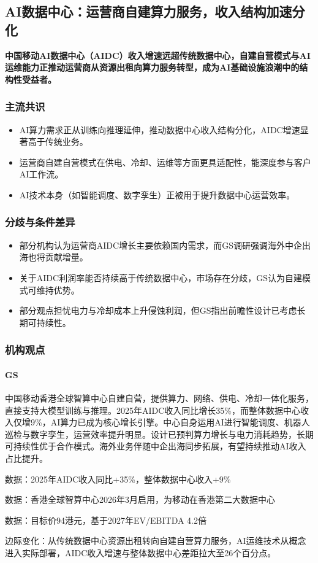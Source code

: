 \documentclass[11pt]{ctexart}
\begin{document}
\subsection{AI数据中心：运营商自建算力服务，收入结构加速分化}
\textbf{中国移动AI数据中心（AIDC）收入增速远超传统数据中心，自建自营模式与AI运维能力正推动运营商从资源出租向算力服务转型，成为AI基础设施浪潮中的结构性受益者。}
\subsubsection*{主流共识}
\begin{itemize}
  \item AI算力需求正从训练向推理延伸，推动数据中心收入结构分化，AIDC增速显著高于传统业务。
  \item 运营商自建自营模式在供电、冷却、运维等方面更具适配性，能深度参与客户AI工作流。
  \item AI技术本身（如智能调度、数字孪生）正被用于提升数据中心运营效率。
\end{itemize}
\subsubsection*{分歧与条件差异}
\begin{itemize}
  \item 部分机构认为运营商AIDC增长主要依赖国内需求，而GS调研强调海外中企出海也将贡献增量。
  \item 关于AIDC利润率能否持续高于传统数据中心，市场存在分歧，GS认为自建模式可维持优势。
  \item 部分观点担忧电力与冷却成本上升侵蚀利润，但GS指出前瞻性设计已考虑长期可持续性。
\end{itemize}
\subsubsection*{机构观点}
\paragraph{GS} 中国移动香港全球智算中心自建自营，提供算力、网络、供电、冷却一体化服务，直接支持大模型训练与推理。2025年AIDC收入同比增长35\%，而整体数据中心收入仅增9\%，AI算力已成为核心增长引擎。中心自身运用AI进行智能调度、机器人巡检与数字孪生，运营效率提升明显。设计已预判算力增长与电力消耗趋势，长期可持续性优于合作模式。海外业务伴随中企出海同步拓展，有望持续推动AI收入占比提升。
{\small\color{refgray}数据：2025年AIDC收入同比+35\%，整体数据中心收入+9\%\par}
{\small\color{refgray}数据：香港全球智算中心2026年3月启用，为移动在香港第二大数据中心\par}
{\small\color{refgray}数据：目标价94港元，基于2027年EV/EBITDA 4.2倍\par}
{\small\color{refgray}边际变化：从传统数据中心资源出租转向自建自营算力服务，AI运维技术从概念进入实际部署，AIDC收入增速与整体数据中心差距拉大至26个百分点。\par}
\end{document}
